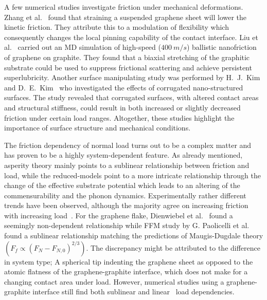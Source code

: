 

A few numerical studies investigate friction under mechanical deformations.
Zhang et al.~\cite{zhang_tuning_2019} found that straining a suspended graphene
sheet will lower the kinetic friction. They attribute this to a modulation of
flexibility which consequently changes the local pinning capability of the
contact interface. Liu et al.~\cite{liu_high-speed_2014} carried out an
\acrshort{MD} simulation of high-speed ($\SI{400}{m/s}$) ballistic nanofriction
of graphene on graphite. They found that a biaxial stretching of the graphitic
substrate could be used to suppress frictional scattering and achieve persistent
superlubricity. Another surface manipulating study was performed by H.\ J.\ Kim
and D.\ E.\ Kim~\cite{Kim_2012} who investigated the effects of corrugated
nano-structured surfaces. The study revealed that corrugated surfaces, with
altered contact areas and structural stiffness, could result in both increased or
slightly decreased friction under certain load ranges. Altogether, these studies
highlight the importance of surface structure and mechanical conditions. 


The friction dependency of normal load turns out to be a complex matter and has
proven to be a highly system-dependent feature. As already mentioned, asperity
theory mainly points to a sublinear relationship between friction and load,
while the reduced-models point to a more intricate relationship through
the change of the effective substrate potential which leads to an altering of
the commensurability and the phonon dynamics. Experimentally rather different trends have been observed, although the majority agree on increasing friction with
increasing load~\cite[p. 200]{gnecco_meyer_2015}. For the graphene flake,
Dienwiebel et al.~\cite{DIENWIEBEL2005197} found a seemingly non-dependent
relationship while \acrshort{FFM} study by G. Paolicelli et al.\
\cite{Paolicelli_2015} found a sublinear relationship matching the predictions of
Maugis-Dugdale theory $(F_f \propto (F_N - F_{N,0})^{2/3})$. The discrepancy
might be attributed to the difference in system type; A spherical tip indenting the graphene sheet as opposed to the atomic flatness of the graphene-graphite
interface, which does not make for a changing contact area under load. However,
numerical studies using a graphene-graphite interface still find both sublinear
\cite{bonelli_atomistic_2009} and linear~\cite{ma12091425, zhang_tuning_2019}
load dependencies. 

